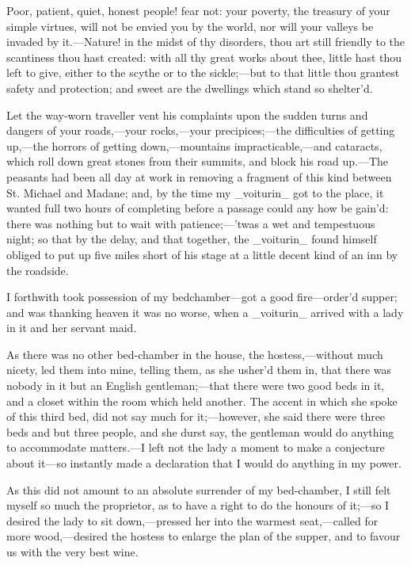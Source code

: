 \documentclass[twoside]{article}
\begin{document}
Poor, patient, quiet, honest people! fear not: your poverty, the treasury
of your simple virtues, will not be envied you by the world, nor will
your valleys be invaded by it.—Nature! in the midst of thy disorders,
thou art still friendly to the scantiness thou hast created: with all thy
great works about thee, little hast thou left to give, either to the
scythe or to the sickle;—but to that little thou grantest safety and
protection; and sweet are the dwellings which stand so shelter’d.

Let the way-worn traveller vent his complaints upon the sudden turns and
dangers of your roads,—your rocks,—your precipices;—the difficulties of
getting up,—the horrors of getting down,—mountains impracticable,—and
cataracts, which roll down great stones from their summits, and block his
road up.—The peasants had been all day at work in removing a fragment of
this kind between St. Michael and Madane; and, by the time my _voiturin_
got to the place, it wanted full two hours of completing before a passage
could any how be gain’d: there was nothing but to wait with
patience;—’twas a wet and tempestuous night; so that by the delay, and
that together, the _voiturin_ found himself obliged to put up five miles
short of his stage at a little decent kind of an inn by the roadside.

I forthwith took possession of my bedchamber—got a good fire—order’d
supper; and was thanking heaven it was no worse, when a _voiturin_ arrived
with a lady in it and her servant maid.

As there was no other bed-chamber in the house, the hostess,—without much
nicety, led them into mine, telling them, as she usher’d them in, that
there was nobody in it but an English gentleman;—that there were two good
beds in it, and a closet within the room which held another.  The accent
in which she spoke of this third bed, did not say much for it;—however,
she said there were three beds and but three people, and she durst say,
the gentleman would do anything to accommodate matters.—I left not the
lady a moment to make a conjecture about it—so instantly made a
declaration that I would do anything in my power.

As this did not amount to an absolute surrender of my bed-chamber, I
still felt myself so much the proprietor, as to have a right to do the
honours of it;—so I desired the lady to sit down,—pressed her into the
warmest seat,—called for more wood,—desired the hostess to enlarge the
plan of the supper, and to favour us with the very best wine.
\end{document}
